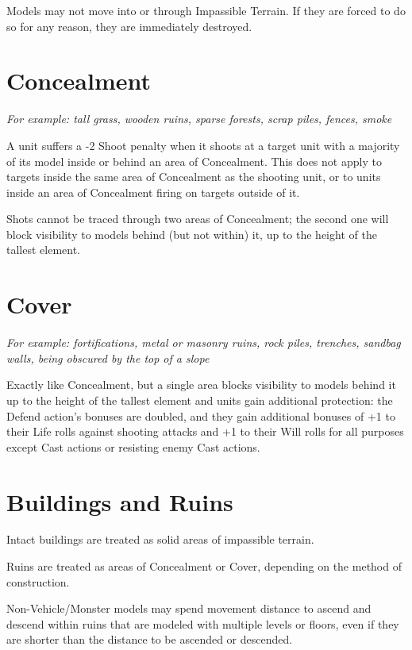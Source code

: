 \begin{multicols}{2}
Models may not move into or through Impassible Terrain. If they are forced to do so for any reason, they are immediately destroyed.




\section*{Concealment}
\textit{For example: tall grass, wooden ruins, sparse forests, scrap piles, fences, smoke}

A unit suffers a -2 Shoot penalty when it shoots at a target unit with a majority of its model inside or behind an area of Concealment. This does not apply to targets inside the same area of Concealment as the shooting unit, or to units inside an area of Concealment firing on targets outside of it.

Shots cannot be traced through two areas of Concealment; the second one will block visibility to models behind (but not within) it, up to the height of the tallest element.




\section*{Cover}
\textit{For example: fortifications, metal or masonry ruins, rock piles, trenches, sandbag walls, being obscured by the top of a slope}

Exactly like Concealment, but a single area blocks visibility to models behind it up to the height of the tallest element and units gain additional protection: the Defend action's bonuses are doubled, and they gain additional bonuses of +1 to their Life rolls against shooting attacks and +1 to their Will rolls for all purposes except Cast actions or resisting enemy Cast actions.


\section*{Buildings and Ruins}
Intact buildings are treated as solid areas of impassible terrain.

Ruins are treated as areas of Concealment or Cover, depending on the method of construction.

Non-Vehicle/Monster models may spend movement distance to ascend and descend within ruins that are modeled with multiple levels or floors, even if they are shorter than the distance to be ascended or descended.






\end{multicols}
